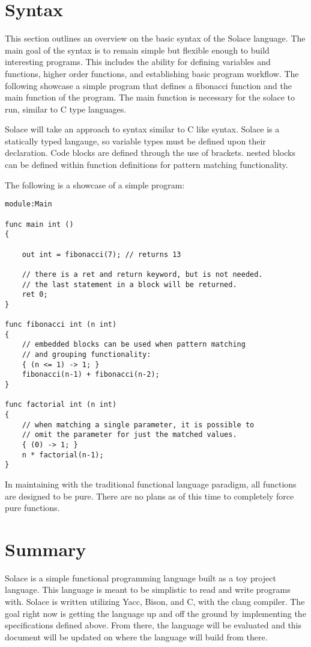 \documentclass{article}
\begin{document}
\section{Syntax}
This section outlines an overview on the basic syntax of the Solace language.
The main goal of the syntax is to remain simple but flexible enough to build
interesting programs. This includes the ability for defining variables and functions,
higher order functions, and establishing basic program workflow.
The following showcase a simple program that defines a fibonacci function and 
the main function of the program. The main function is necessary for the solace to
run, similar to C type languages.

Solace will take an approach to syntax similar to C like syntax. Solace is a statically typed
langauge, so variable types must be defined upon their declaration. Code blocks are defined
through the use of brackets. nested blocks can be defined within function definitions
for pattern matching functionality.


The following is a showcase of a simple program:
\begin{lstlisting}
module:Main

func main int ()
{
	
	out int = fibonacci(7); // returns 13
	
	// there is a ret and return keyword, but is not needed.
	// the last statement in a block will be returned.
	ret 0;
}

func fibonacci int (n int)
{
	// embedded blocks can be used when pattern matching
	// and grouping functionality:
	{ (n <= 1) -> 1; }
	fibonacci(n-1) + fibonacci(n-2);
}

func factorial int (n int)
{
	// when matching a single parameter, it is possible to
	// omit the parameter for just the matched values.
	{ (0) -> 1; }
	n * factorial(n-1);
}
\end{lstlisting}

In maintaining with the traditional functional language paradigm, all functions are
designed to be pure. There are no plans as of this time to completely force pure functions.

\section{Summary}
Solace is a simple functional programming language built as a toy project language.
This language is meant to be simplistic to read and write programs with. Solace is written 
utilizing Yacc, Bison, and C, with the clang compiler.
The goal right now is getting the language up and off the ground by implementing the
specifications defined above. From there, the language will be evaluated and this document
will be updated on where the language will build from there.
\end{document}
